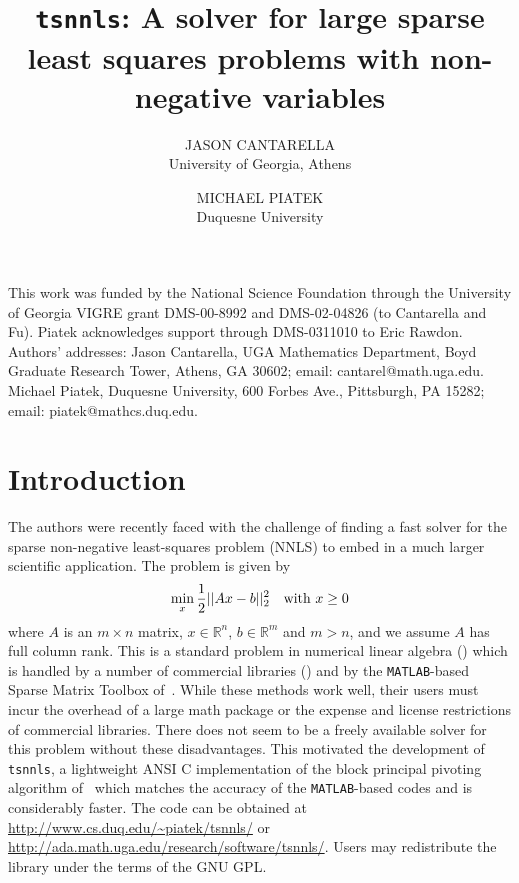\documentclass[acmtoms,acmnow,aps,floatfix]{acmtrans2m}
\title{\texttt{tsnnls}: A solver for large sparse least squares problems with non-negative variables}
\author{JASON CANTARELLA\\ University of Georgia, Athens \and MICHAEL PIATEK\\Duquesne University}
\def\marginpar#1{}   %
\let\lbl=\label
\def\label#1{\lbl{#1}\ifinner\else\marginpar{\ref{#1} #1}\ignorespaces\fi}
\begin{document}
\begin{bottomstuff}
This work was funded by the National Science Foundation through the University of Georgia VIGRE grant DMS-00-8992 and DMS-02-04826 (to Cantarella and Fu). Piatek acknowledges support through DMS-0311010 to Eric Rawdon.\\
Authors' addresses: Jason Cantarella, UGA Mathematics Department, Boyd Graduate Research Tower, Athens, GA 30602; email: cantarel@math.uga.edu. Michael Piatek, Duquesne University, 600 Forbes Ave., Pittsburgh, PA 15282; email: piatek@mathcs.duq.edu.
\end{bottomstuff}

\maketitle

\section{Introduction}
\label{sec:intro}

The authors were recently faced with the challenge of finding 
a fast solver for the sparse non-negative least-squares problem (NNLS) to embed
in a much larger scientific application. The problem is given by 
\begin{equation}
\label{eqn:nnls}
\min_x \frac{1}{2}|| Ax - b ||^2_2 \quad \mbox{with } x \geq 0
\end{equation}
where $A$ is an $m \times n$ matrix, $x \in \mathbb{R}^n$, $b \in \mathbb{R}^m$ and $m > n$, and
we assume $A$ has full column rank. This is a standard problem in numerical linear algebra (\cite{MR96d:65067,MR97g:65004}) which is handled by a number of commercial libraries (\cite{MR2000h:90104,knitro,TOMLAB}) and by the \texttt{MATLAB}-based Sparse Matrix Toolbox of~\cite{sls}. While these methods work well, their users must incur the overhead of a large math package or the expense and license restrictions of commercial libraries. There does not seem to be a freely available solver for this problem without these disadvantages. This motivated the development of \texttt{tsnnls}, a lightweight ANSI C implementation of the block principal pivoting algorithm of~\cite{MR95a:90059} which matches the accuracy of the \texttt{MATLAB}-based codes and is considerably faster.
The code can be obtained at \url{http://www.cs.duq.edu/~piatek/tsnnls/} or
 \url{http://ada.math.uga.edu/research/software/tsnnls/}.  Users may redistribute the library under the terms of the GNU GPL.
\end{document}
